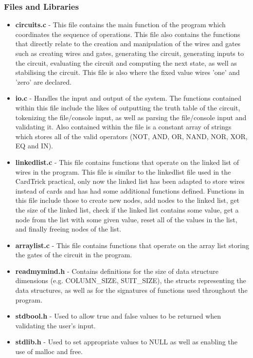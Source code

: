 \documentclass[11]{article}
\begin{document}
		\subsubsection{Files and Libraries}
				\begin{itemize}
					\item \textbf{circuits.c} - This file contains the main function of the program which coordinates the sequence of operations. This file also contains the functions that directly relate to the creation and manipulation of the wires and gates such as creating wires and gates, generating the circuit, generating inputs to the circuit, evaluating the circuit and computing the next state, as well as stabilising the circuit. This file is also where the fixed value wires 'one' and 'zero' are declared.
					\item \textbf{io.c} - Handles the input and output of the system. The functions contained within this file include the likes of outputting the truth table of the circuit, tokenizing the file/console input, as well as parsing the file/console input and validating it. Also contained within the file is a constant array of strings which stores all of the valid operators (NOT, AND, OR, NAND, NOR, XOR, EQ and IN).
					\item \textbf{linkedlist.c} - This file contains functions that operate on the linked list of wires in the program. This file is similar to the linkedlist file used in the CardTrick practical, only now the linked list has been adapted to store wires instead of cards and has had some additional functions defined. Functions in this file include those to create new nodes, add nodes to the linked list, get the size of the linked list, check if the linked list contains some value, get a node from the list with some given value, reset all of the values in the list, and finally freeing nodes of the list.
					\item \textbf{arraylist.c} - This file contains functions that operate on the array list storing the gates of the circuit in the program.
					\item \textbf{readmymind.h} - Contains definitions for the size of data structure dimensions (e.g. COLUMN\_SIZE, SUIT\_SIZE), the structs representing the data structures, as well as for the signatures of functions used throughout the program.
					\item \textbf{stdbool.h} - Used to allow true and false values to be returned when validating the user's input.
					
					\item \textbf{stdlib.h} - Used to set appropriate values to NULL as well as enabling the use of malloc and free.
					

\end{itemize}
\end{document}
